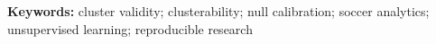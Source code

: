 \documentclass[11pt]{article}
\begin{document}
\maketitle

\begin{abstract}

\end{abstract}

\noindent\textbf{Keywords:} cluster validity; clusterability; null calibration; soccer
analytics; unsupervised learning; reproducible research

\vspace{1em}








\end{document}
